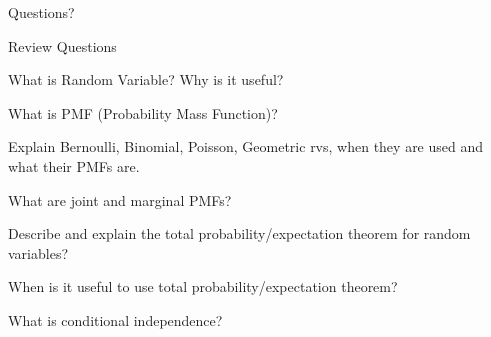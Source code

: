 \begin{frame}{}
\vspace{2cm}
\LARGE Questions?

\end{frame}

\begin{frame}{Review Questions}

\bce[1)]
\item What is Random Variable? Why is it useful?

\item What is PMF (Probability Mass Function)?

\item Explain Bernoulli, Binomial, Poisson, Geometric rvs, when they are used and what their PMFs are. 

\item What are joint and marginal PMFs?

\item Describe and explain the total probability/expectation theorem for random variables?

\item When is it useful to use total probability/expectation theorem?

\item What is conditional independence? 
\ece
\end{frame}




